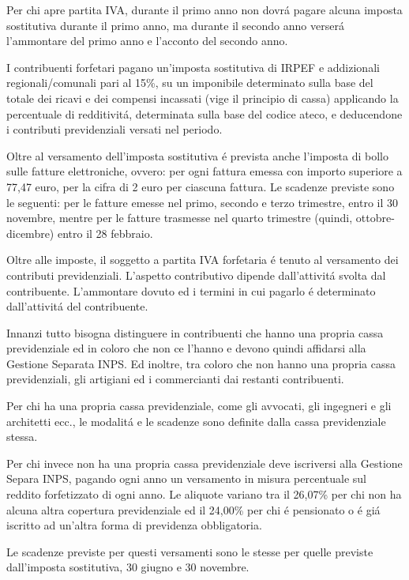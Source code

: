 \documentclass{article}
\begin{document}
Per chi apre partita IVA, durante il primo anno non dovr\'a pagare alcuna imposta sostitutiva durante il primo anno, 
ma durante il secondo anno verser\'a l'ammontare del primo anno e l'acconto del secondo anno.

I contribuenti forfetari pagano un'imposta sostitutiva di IRPEF e addizionali regionali/comunali pari al 15\%, su un imponibile determinato sulla base del totale dei ricavi e dei compensi incassati (vige il principio di cassa) applicando la percentuale di redditivit\'a,
determinata sulla base del codice ateco, e deducendone i contributi previdenziali versati nel periodo.

Oltre al versamento dell'imposta sostitutiva \'e prevista anche l'imposta di bollo sulle fatture elettroniche, ovvero:
per ogni fattura emessa con importo superiore a 77,47 euro, per la cifra di 2 euro per ciascuna fattura. Le scadenze previste sono le seguenti:
per le fatture emesse nel primo, secondo e terzo trimestre, entro il 30 novembre, mentre per le fatture trasmesse nel quarto trimestre (quindi, ottobre-dicembre) entro il 28 febbraio. 

Oltre alle imposte, il soggetto a partita IVA forfetaria \'e tenuto al versamento dei contributi previdenziali.
L'aspetto contributivo dipende dall'attivit\'a svolta dal contribuente.
L'ammontare dovuto ed i termini in cui pagarlo \'e determinato dall'attivit\'a del contribuente.

Innanzi tutto bisogna distinguere in contribuenti che hanno una propria cassa previdenziale ed in coloro che non ce l'hanno e devono quindi affidarsi alla Gestione Separata INPS.
Ed inoltre, tra coloro che non hanno una propria cassa previdenziali, gli artigiani ed i commercianti dai restanti contribuenti. 

Per chi ha una propria cassa previdenziale, come gli avvocati, gli ingegneri e gli architetti ecc., le modalit\'a e le scadenze sono definite dalla cassa previdenziale stessa. 

Per chi invece non ha una propria cassa previdenziale deve iscriversi alla Gestione Separa INPS, pagando ogni anno un versamento in misura percentuale sul reddito forfetizzato di ogni anno.
Le aliquote variano tra il 26,07\% per chi non ha alcuna altra copertura previdenziale ed il 24,00\% per chi \'e pensionato o \'e gi\'a iscritto ad un'altra forma di previdenza obbligatoria.

Le scadenze previste per questi versamenti sono le stesse per quelle previste dall'imposta sostitutiva, 30 giugno e 30 novembre.
\end{document}
